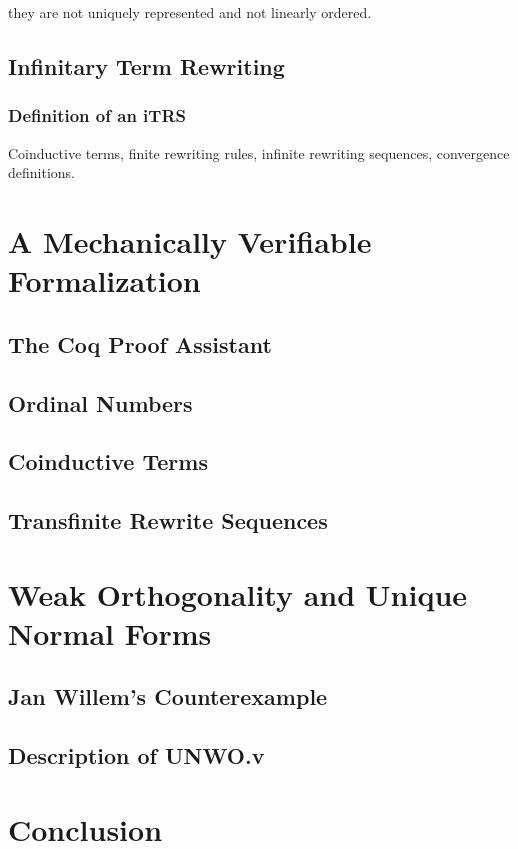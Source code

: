 \documentclass[11pt,oneside,a4paper,final]{report}
\theoremstyle{definition}
\begin{document}
they are not uniquely represented and not linearly ordered.


\section{Infinitary Term Rewriting}\label{sec:itr}


\subsection{Definition of an iTRS}

Coinductive terms, finite rewriting rules, infinite rewriting sequences,
convergence definitions.


\chapter{A Mechanically Verifiable Formalization}\label{chap:formalization}


\section{The Coq Proof Assistant}


\section{Ordinal Numbers}


\section{Coinductive Terms}


\section{Transfinite Rewrite Sequences}


\chapter{Weak Orthogonality and Unique Normal Forms}\label{chap:unwo}


\section{Jan Willem's Counterexample}


\section{Description of UNWO.v}


\chapter{Conclusion}\label{chap:conclusion}


\pagebreak


\nocite{*}


\end{document}
